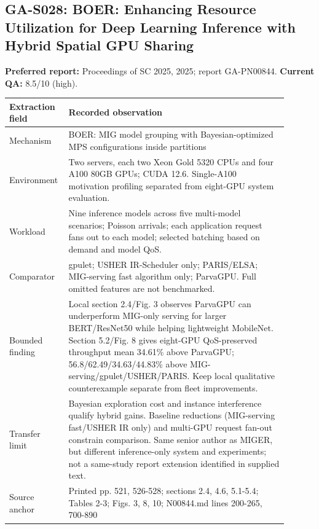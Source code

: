 \subsection{GA-S028: BOER: Enhancing Resource Utilization for Deep Learning Inference with Hybrid Spatial GPU Sharing}
\textbf{Preferred report:} Proceedings of SC 2025, 2025; report GA-PN00844. \textbf{Current QA:} 8.5/10 (high).
\begin{longtable}{P{0.15\linewidth}P{0.75\linewidth}}
\toprule Extraction field & Recorded observation\\\midrule\endhead
Mechanism & BOER: MIG model grouping with Bayesian-optimized MPS configurations inside partitions\\
Environment & Two servers, each two Xeon Gold 5320 CPUs and four A100 80GB GPUs; CUDA 12.6. Single-A100 motivation profiling separated from eight-GPU system evaluation.\\
Workload & Nine inference models across five multi-model scenarios; Poisson arrivals; each application request fans out to each model; selected batching based on demand and model QoS.\\
Comparator & gpulet; USHER IR-Scheduler only; PARIS/ELSA; MIG-serving fast algorithm only; ParvaGPU. Full omitted features are not benchmarked.\\
Bounded finding & Local section 2.4/Fig. 3 observes ParvaGPU can underperform MIG-only serving for larger BERT/ResNet50 while helping lightweight MobileNet. Section 5.2/Fig. 8 gives eight-GPU QoS-preserved throughput mean 34.61\% above ParvaGPU; 56.8/62.49/34.63/44.83\% above MIG-serving/gpulet/USHER/PARIS. Keep local qualitative counterexample separate from fleet improvements.\\
Transfer limit & Bayesian exploration cost and instance interference qualify hybrid gains. Baseline reductions (MIG-serving fast/USHER IR only) and multi-GPU request fan-out constrain comparison. Same senior author as MIGER, but different inference-only system and experiments; not a same-study report extension identified in supplied text.\\
Source anchor & Printed pp. 521, 526-528; sections 2.4, 4.6, 5.1-5.4; Tables 2-3; Figs. 3, 8, 10; N00844.md lines 200-265, 700-890\\
\bottomrule\end{longtable}
